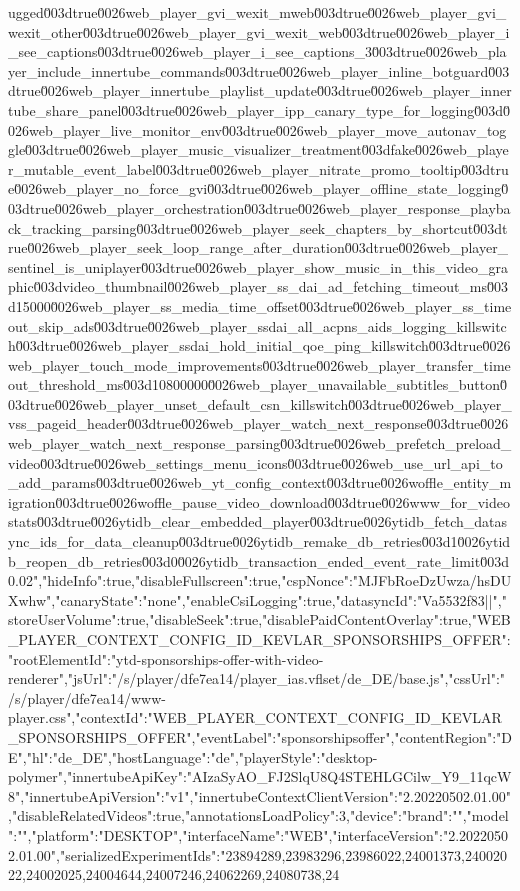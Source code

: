 {ugged\u003dtrue\u0026web_player_gvi_wexit_mweb\u003dtrue\u0026web_player_gvi_wexit_other\u003dtrue\u0026web_player_gvi_wexit_web\u003dtrue\u0026web_player_i_see_captions\u003dtrue\u0026web_player_i_see_captions_3\u003dtrue\u0026web_player_include_innertube_commands\u003dtrue\u0026web_player_inline_botguard\u003dtrue\u0026web_player_innertube_playlist_update\u003dtrue\u0026web_player_innertube_share_panel\u003dtrue\u0026web_player_ipp_canary_type_for_logging\u003d\u0026web_player_live_monitor_env\u003dtrue\u0026web_player_move_autonav_toggle\u003dtrue\u0026web_player_music_visualizer_treatment\u003dfake\u0026web_player_mutable_event_label\u003dtrue\u0026web_player_nitrate_promo_tooltip\u003dtrue\u0026web_player_no_force_gvi\u003dtrue\u0026web_player_offline_state_logging\u003dtrue\u0026web_player_orchestration\u003dtrue\u0026web_player_response_playback_tracking_parsing\u003dtrue\u0026web_player_seek_chapters_by_shortcut\u003dtrue\u0026web_player_seek_loop_range_after_duration\u003dtrue\u0026web_player_sentinel_is_uniplayer\u003dtrue\u0026web_player_show_music_in_this_video_graphic\u003dvideo_thumbnail\u0026web_player_ss_dai_ad_fetching_timeout_ms\u003d15000\u0026web_player_ss_media_time_offset\u003dtrue\u0026web_player_ss_timeout_skip_ads\u003dtrue\u0026web_player_ssdai_all_acpns_aids_logging_killswitch\u003dtrue\u0026web_player_ssdai_hold_initial_qoe_ping_killswitch\u003dtrue\u0026web_player_touch_mode_improvements\u003dtrue\u0026web_player_transfer_timeout_threshold_ms\u003d10800000\u0026web_player_unavailable_subtitles_button\u003dtrue\u0026web_player_unset_default_csn_killswitch\u003dtrue\u0026web_player_vss_pageid_header\u003dtrue\u0026web_player_watch_next_response\u003dtrue\u0026web_player_watch_next_response_parsing\u003dtrue\u0026web_prefetch_preload_video\u003dtrue\u0026web_settings_menu_icons\u003dtrue\u0026web_use_url_api_to_add_params\u003dtrue\u0026web_yt_config_context\u003dtrue\u0026woffle_entity_migration\u003dtrue\u0026woffle_pause_video_download\u003dtrue\u0026www_for_videostats\u003dtrue\u0026ytidb_clear_embedded_player\u003dtrue\u0026ytidb_fetch_datasync_ids_for_data_cleanup\u003dtrue\u0026ytidb_remake_db_retries\u003d1\u0026ytidb_reopen_db_retries\u003d0\u0026ytidb_transaction_ended_event_rate_limit\u003d0.02","hideInfo":true,"disableFullscreen":true,"cspNonce":"MJFbRoeDzUwza/hsDUXwhw","canaryState":"none","enableCsiLogging":true,"datasyncId":"Va5532f83||","storeUserVolume":true,"disableSeek":true,"disablePaidContentOverlay":true},"WEB_PLAYER_CONTEXT_CONFIG_ID_KEVLAR_SPONSORSHIPS_OFFER":{"rootElementId":"ytd-sponsorships-offer-with-video-renderer","jsUrl":"/s/player/dfe7ea14/player_ias.vflset/de_DE/base.js","cssUrl":"/s/player/dfe7ea14/www-player.css","contextId":"WEB_PLAYER_CONTEXT_CONFIG_ID_KEVLAR_SPONSORSHIPS_OFFER","eventLabel":"sponsorshipsoffer","contentRegion":"DE","hl":"de_DE","hostLanguage":"de","playerStyle":"desktop-polymer","innertubeApiKey":"AIzaSyAO_FJ2SlqU8Q4STEHLGCilw_Y9_11qcW8","innertubeApiVersion":"v1","innertubeContextClientVersion":"2.20220502.01.00","disableRelatedVideos":true,"annotationsLoadPolicy":3,"device":{"brand":"","model":"","platform":"DESKTOP","interfaceName":"WEB","interfaceVersion":"2.20220502.01.00"},"serializedExperimentIds":"23894289,23983296,23986022,24001373,24002022,24002025,24004644,24007246,24062269,24080738,24}
